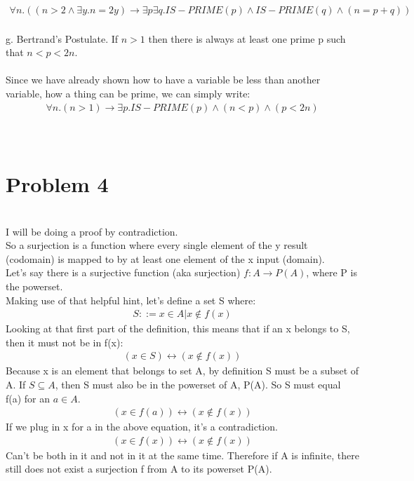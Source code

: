 \documentclass{article}
\begin{document}
\begin {align*}
\forall n. ((n > 2 \wedge \exists y. n = 2y) \rightarrow \exists p \exists q. IS-PRIME(p) \wedge IS-PRIME(q) \wedge (n = p + q))
\end {align*}
\\
g. Bertrand's Postulate. If $n > 1$ then there is always at least one prime p such that $n < p < 2n$. 
\\\\
Since we have already shown how to have a variable be less than another variable, how a thing can be prime, we can simply write:
\begin {align*}
\forall n. (n > 1) \rightarrow \exists p. IS-PRIME(p) \wedge (n < p) \wedge (p < 2n)
\end {align*}
\\\\

\section{Problem 4}
\\
I will be doing a proof by contradiction.
\\
So a surjection is a function where every single element of the y result (codomain) is mapped to by at least one element of the x input (domain).
\\
Let's say there is a surjective function (aka surjection) $f: A \rightarrow P(A)$, where P is the powerset.  
\\
Making use of that helpful hint, let's define a set S where:
\begin {align*}
S ::= x \in A | x \not \in f(x)
\end {align*}
Looking at that first part of the definition, this means that if an x belongs to S, then it must not be in f(x):
\\
\begin {align*}
(x \in S) \leftrightarrow (x \not \in f(x))
\end {align*}
Because x is an element that belongs to set A, by definition S must be a subset of A. If $S \subseteq A$, then S must also be in the powerset of A, P(A). So S must equal f(a) for an $a \in A$.
\begin {align*}
(x \in f(a)) \leftrightarrow (x \not \in f(x))
\end {align*}
If we plug in x for a in the above equation, it's a contradiction. 
\begin {align*}
(x \in f(x)) \leftrightarrow (x \not \in f(x))
\end {align*}
Can't be both in it and not in it at the same time. Therefore if A is infinite, there still does not exist a surjection f from A to its powerset P(A). 
\end{document}
